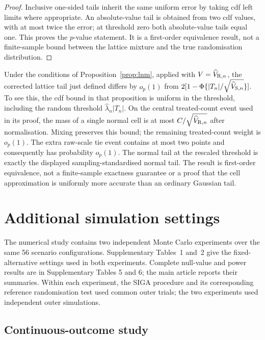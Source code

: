 \documentclass[12pt,a4paper]{article}
\theoremstyle{definition}
\theoremstyle{remark}\newtheorem{remark}{Remark}
\numberwithin{equation}{section}
\begin{document}
\begin{proof}
Inclusive one-sided tails inherit the same uniform error by taking cdf left limits where appropriate. An absolute-value tail is obtained from two cdf values, with at most twice the error; at threshold zero both absolute-value tails equal one. This proves the $p$-value statement. It is a first-order equivalence result, not a finite-sample bound between the lattice mixture and the true randomisation distribution.
\end{proof}



Under the conditions of Proposition~\ref{prop:lnm}, applied with $V=\widehat V_{{\rm R},n}$, the corrected lattice tail just defined differs by $o_p(1)$ from $2[1-\Phi\{|T_n|/\sqrt{\widehat V_{{\rm S},n}}\}]$. To see this, the cdf bound in that proposition is uniform in the threshold, including the random threshold $\widehat\lambda_n|T_n|$. On the central treated-count event used in its proof, the mass of a single normal cell is at most $C/\sqrt{\widehat V_{{\rm R},n}}$ after normalisation. Mixing preserves this bound; the remaining treated-count weight is $o_p(1)$. The extra raw-scale tie event contains at most two points and consequently has probability $o_p(1)$. The normal tail at the rescaled threshold is exactly the displayed sampling-standardised normal tail. The result is first-order equivalence, not a finite-sample exactness guarantee or a proof that the cell approximation is uniformly more accurate than an ordinary Gaussian tail.

\section{Additional simulation settings}\label{sec:supp-simulation-tables}

The numerical study contains two independent Monte Carlo experiments over the same 56 scenario configurations. Supplementary Tables~1 and~2 give the fixed-alternative settings used in both experiments. Complete null-value and power results are in Supplementary Tables 5 and 6; the main article reports their summaries. Within each experiment, the SIGA procedure and its corresponding reference randomisation test used common outer trials; the two experiments used independent outer simulations.

\subsection{Continuous-outcome study}\label{sec:supp-continuous-model}
\end{document}
